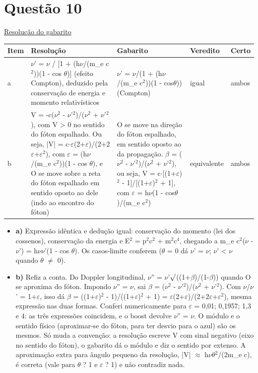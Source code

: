 \documentclass{article}%
\begin{document}
\section*{Questão 10}%
\href{https://poliedroresolve.sistemapoliedro.com.br/vestibulares/ita/2027/ita-2-fase-dia-3-22-10-2026-2-fase-dia-3/dissertativa-10-fisica-2-fase-dia-3-ita-2027}{Resolução do gabarito}\par\smallskip%
\begin{longtable}{@{}p{} p{} p{} p{} p{}@{}}\toprule Item & Resolução & Gabarito & Veredito & Certo \\ \midrule
a & $\nu$' = $\nu$ / {[}1 + (h$\nu$/(m\_e c$^2$))(1 - cos $\theta$){]} (efeito Compton), deduzido pela conservação de energia e momento relativísticos & $\nu$' = $\nu$/(1 + (h$\nu$/(m\_e c$^2$))(1 - cos$\theta$)) (Compton) & igual & ambos \\
b & V = -c($\nu$$^2$ - $\nu$'$^2$)/($\nu$$^2$ + $\nu$'$^2$), com V > 0 no sentido do fóton espalhado. Ou seja, |V| = c$\cdot$$\varepsilon$(2+$\varepsilon$)/(2+2$\varepsilon$+$\varepsilon$$^2$), com $\varepsilon$ = (h$\nu$/(m\_e c$^2$))(1 - cos $\theta$), e O se move sobre a reta do fóton espalhado em sentido oposto ao dele (indo ao encontro do fóton) & O se move na direção do fóton espalhado, em sentido oposto ao da propagação. $\beta$ = ($\nu$$^2$ - $\nu$'$^2$)/($\nu$$^2$ + $\nu$'$^2$), ou seja, V = c$\cdot${[}(1+$\varepsilon$)$^2$ - 1{]}/{[}(1+$\varepsilon$)$^2$ + 1{]}, com $\varepsilon$ = h$\nu$(1 - cos$\theta$)/(m\_e c$^2$) & equivalente & ambos \\
\bottomrule\end{longtable}%
\begin{itemize}%
\item%
\textbf{a)} Expressão idêntica e dedução igual: conservação do momento (lei dos cossenos), conservação da energia e E$^2$ = p$^2$c$^2$ + m$^2$c$^{4}$, chegando a m\_e c$^2$($\nu$ - $\nu$') = h$\nu$$\nu$'(1 - cos $\theta$). Os casos{-}limite conferem ($\theta$ = 0 dá $\nu$' = $\nu$; $\nu$' < $\nu$ quando $\theta$ $\neq$ 0).%
\item%
\textbf{b)} Refiz a conta. Do Doppler longitudinal, $\nu$'' = $\nu$'$\surd$((1+$\beta$)/(1-$\beta$)) quando O se aproxima do fóton. Impondo $\nu$'' = $\nu$, sai $\beta$ = ($\nu$$^2$ - $\nu$'$^2$)/($\nu$$^2$ + $\nu$'$^2$). Com $\nu$/$\nu$' = 1+$\varepsilon$, isso dá $\beta$ = ((1+$\varepsilon$)$^2$ - 1)/((1+$\varepsilon$)$^2$ + 1) = $\varepsilon$(2+$\varepsilon$)/(2+2$\varepsilon$+$\varepsilon$$^2$), mesma expressão nas duas formas. Conferi numericamente para $\varepsilon$ = 0,01; 0,1957; 1,3 e 4: as três expressões coincidem, e o boost devolve $\nu$'' = $\nu$. O módulo e o sentido físico (aproximar{-}se do fóton, para ter desvio para o azul) são os mesmos. Só muda a convenção: a resolução escreve V com sinal negativo (eixo no sentido do fóton), o gabarito dá o módulo e diz o sentido por extenso. A aproximação extra para ângulo pequeno da resolução, |V| $\approx$ h$\nu$$\theta$$^2$/(2m\_e c), é correta (vale para $\theta$ ? 1 e $\varepsilon$ ? 1) e não contradiz nada.%
\end{itemize}%
\end{document}
